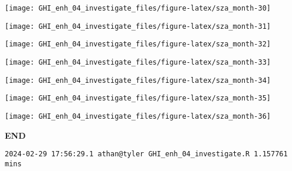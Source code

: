 \documentclass[
  10pt,
  a4paper,oneside]{article}
\begin{document}
\begin{center}\texttt{[image: GHI\_enh\_04\_investigate\_files/figure-latex/sza\_month-30]} \end{center}

\begin{center}\texttt{[image: GHI\_enh\_04\_investigate\_files/figure-latex/sza\_month-31]} \end{center}

\begin{center}\texttt{[image: GHI\_enh\_04\_investigate\_files/figure-latex/sza\_month-32]} \end{center}

\begin{center}\texttt{[image: GHI\_enh\_04\_investigate\_files/figure-latex/sza\_month-33]} \end{center}

\begin{center}\texttt{[image: GHI\_enh\_04\_investigate\_files/figure-latex/sza\_month-34]} \end{center}

\begin{center}\texttt{[image: GHI\_enh\_04\_investigate\_files/figure-latex/sza\_month-35]} \end{center}

\begin{center}\texttt{[image: GHI\_enh\_04\_investigate\_files/figure-latex/sza\_month-36]} \end{center}

\textbf{END}

\begin{verbatim}
2024-02-29 17:56:29.1 athan@tyler GHI_enh_04_investigate.R 1.157761 mins
\end{verbatim}
\end{document}
